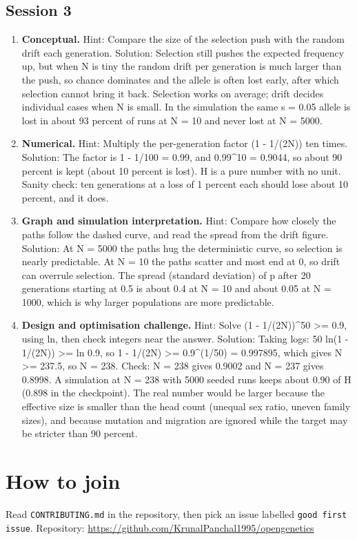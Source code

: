 \documentclass[11pt,a4paper]{article}
\begin{document}
\subsection*{Session 3}
\begin{enumerate}[nosep]
\item \textbf{Conceptual.} Hint: Compare the size of the selection push with the random drift each generation. Solution: Selection still pushes the expected frequency up, but when N is tiny the random drift per generation is much larger than the push, so chance dominates and the allele is often lost early, after which selection cannot bring it back. Selection works on average; drift decides individual cases when N is small. In the simulation the same s = 0.05 allele is lost in about 93 percent of runs at N = 10 and never lost at N = 5000.
\item \textbf{Numerical.} Hint: Multiply the per-generation factor (1 - 1/(2N)) ten times. Solution: The factor is 1 - 1/100 = 0.99, and 0.99\textasciicircum{}10 = 0.9044, so about 90 percent is kept (about 10 percent is lost). H is a pure number with no unit. Sanity check: ten generations at a loss of 1 percent each should lose about 10 percent, and it does.
\item \textbf{Graph and simulation interpretation.} Hint: Compare how closely the paths follow the dashed curve, and read the spread from the drift figure. Solution: At N = 5000 the paths hug the deterministic curve, so selection is nearly predictable. At N = 10 the paths scatter and most end at 0, so drift can overrule selection. The spread (standard deviation) of p after 20 generations starting at 0.5 is about 0.4 at N = 10 and about 0.05 at N = 1000, which is why larger populations are more predictable.
\item \textbf{Design and optimisation challenge.} Hint: Solve (1 - 1/(2N))\textasciicircum{}50 \textgreater{}= 0.9, using ln, then check integers near the answer. Solution: Taking logs: 50 ln(1 - 1/(2N)) \textgreater{}= ln 0.9, so 1 - 1/(2N) \textgreater{}= 0.9\textasciicircum{}(1/50) = 0.997895, which gives N \textgreater{}= 237.5, so N = 238. Check: N = 238 gives 0.9002 and N = 237 gives 0.8998. A simulation at N = 238 with 5000 seeded runs keeps about 0.90 of H (0.898 in the checkpoint). The real number would be larger because the effective size is smaller than the head count (unequal sex ratio, uneven family sizes), and because mutation and migration are ignored while the target may be stricter than 90 percent.
\end{enumerate}

\section{How to join}
Read \texttt{CONTRIBUTING.md} in the repository, then pick an issue labelled \texttt{good first issue}. Repository: \url{https://github.com/KrunalPanchal1995/opengenetics}
\end{document}
